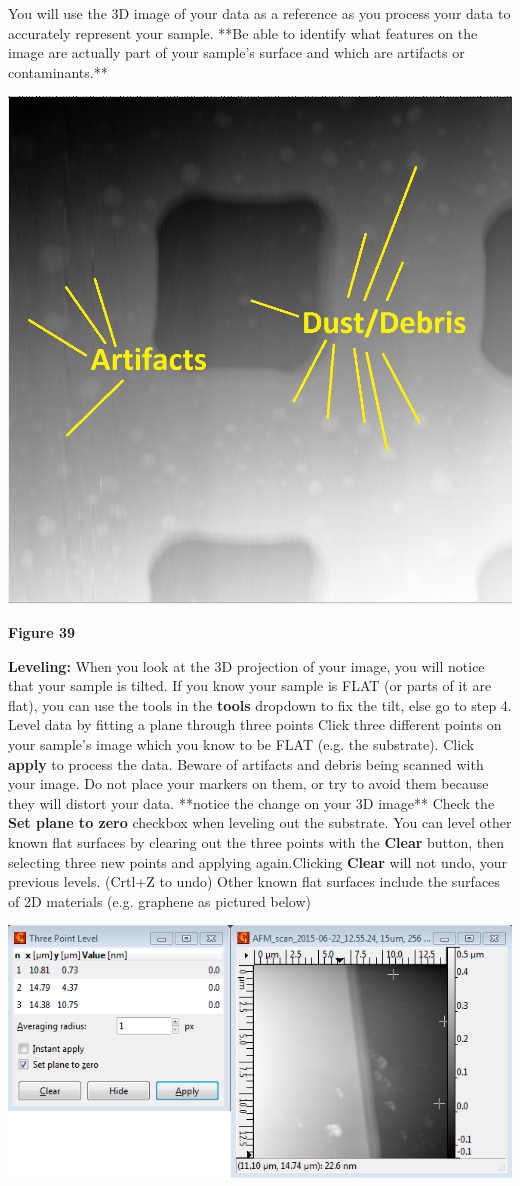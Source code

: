 \documentclass{../lab}
\begin{document}
You will use the 3D image of your data as a reference as you process your data to accurately represent your sample.
**Be able to identify what features on the image are actually part of your sample's surface and which are artifacts or contaminants.**

\begin{center}
    \href{http://experimentationlab.berkeley.edu/sites/default/files/AFMImages/43.png}{\includegraphics[width=0.5\linewidth]{images/43.png}}
\end{center}


\textbf{Figure 39}

\textbf{Leveling:} When you look at the 3D projection of your image, you will notice that your sample is tilted.  If you know your sample is FLAT (or parts of it are flat), you can use the tools in the \textbf{tools} dropdown to fix the tilt, else go to step 4.
 Level data by fitting a plane through three points
Click three different points on your sample's image which you know to be FLAT (e.g. the substrate). Click \textbf{apply} to process the data.
Beware of artifacts and debris being scanned with your image.  Do not place your markers on them, or try to avoid them because they will distort your data.
**notice the change on your 3D image**
Check the \textbf{Set plane to zero} checkbox when leveling out the substrate.
You can level other known flat surfaces by clearing out the three points with the \textbf{Clear} button, then selecting three new points and applying again.Clicking \textbf{Clear} will not undo, your previous levels. (Crtl+Z to undo)
Other known flat surfaces include the surfaces of 2D materials (e.g. graphene as pictured below)




\begin{center}
    \href{http://experimentationlab.berkeley.edu/sites/default/files/AFMImages/45.png}{\includegraphics[width=0.5\linewidth]{images/45.png}}
\end{center}
\end{document}
